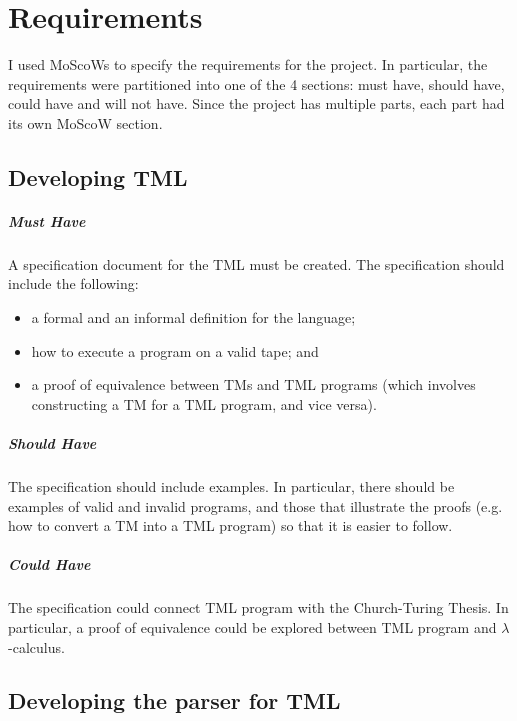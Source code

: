 \chapter{Requirements}

I used MoScoWs to specify the requirements for the project. In particular, the requirements were partitioned into one of the 4 sections: must have, should have, could have and will not have. Since the project has multiple parts, each part had its own MoScoW section.

\section{Developing TML}

\paragraph{Must Have} A specification document for the TML must be created. The specification should include the following:
\begin{itemize}
    \item a formal and an informal definition for the language;
    \item how to execute a program on a valid tape; and
    \item a proof of equivalence between TMs and TML programs (which involves constructing a TM for a TML program, and vice versa).
\end{itemize}

\paragraph{Should Have} The specification should include examples. In particular, there should be examples of valid and invalid programs, and those that illustrate the proofs (e.g. how to convert a TM into a TML program) so that it is easier to follow.

\paragraph{Could Have} The specification could connect TML program with the Church-Turing Thesis. In particular, a proof of equivalence could be explored between TML program and $\lambda$-calculus.

\section{Developing the parser for TML}

